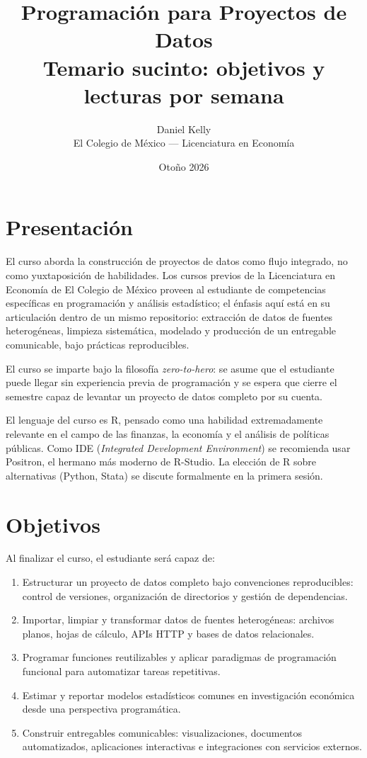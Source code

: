 \documentclass[11pt,letterpaper]{article}
\title{\color{main}\textbf{Programación para Proyectos de Datos}\\[0.3em]
       \large\color{subtitle}Temario sucinto: objetivos y lecturas por semana}
\author{Daniel Kelly\\
        \small El Colegio de México --- Licenciatura en Economía}
\date{Otoño 2026}
\begin{document}
\maketitle

\section{Presentación}

El curso aborda la construcción de proyectos de datos como flujo integrado, no como yuxtaposición de habilidades. Los cursos previos de la Licenciatura en Economía de El Colegio de México proveen al estudiante de competencias específicas en programación y análisis estadístico; el énfasis aquí está en su articulación dentro de un mismo repositorio: extracción de datos de fuentes heterogéneas, limpieza sistemática, modelado y producción de un entregable comunicable, bajo prácticas reproducibles.

El curso se imparte bajo la filosofía \textit{zero-to-hero}: se asume que el estudiante puede llegar sin experiencia previa de programación y se espera que cierre el semestre capaz de levantar un proyecto de datos completo por su cuenta.

El lenguaje del curso es R, pensado como una habilidad extremadamente relevante en el campo de las finanzas, la economía y el análisis de políticas públicas. Como IDE (\textit{Integrated Development Environment}) se recomienda usar Positron, el hermano más moderno de R-Studio. La elección de R sobre alternativas (Python, Stata) se discute formalmente en la primera sesión.

\section{Objetivos}

Al finalizar el curso, el estudiante será capaz de:

\begin{enumerate}[leftmargin=*]
    \item Estructurar un proyecto de datos completo bajo convenciones reproducibles: control de versiones, organización de directorios y gestión de dependencias.
    \item Importar, limpiar y transformar datos de fuentes heterogéneas: archivos planos, hojas de cálculo, APIs HTTP y bases de datos relacionales.
    \item Programar funciones reutilizables y aplicar paradigmas de programación funcional para automatizar tareas repetitivas.
    \item Estimar y reportar modelos estadísticos comunes en investigación económica desde una perspectiva programática.
    \item Construir entregables comunicables: visualizaciones, documentos automatizados, aplicaciones interactivas e integraciones con servicios externos.
\end{enumerate}
\end{document}
